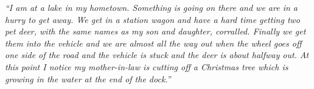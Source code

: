 \begin{minipage}[t]{0.75\textwidth}
\begin{spacing}{0.5}
    {\scriptsize \it
    ``I am at a lake in my hometown.
    Something is going on there and we are in a hurry to get away.
    We get in a station wagon and have a hard time getting two pet deer, with the same names as my son and daughter,
    corralled.
    Finally we get them into the vehicle and we are almost all the way out when the wheel goes off one side of the road
    and the vehicle is stuck and the deer is about halfway out. At this point I notice my mother-in-law is cutting off
    a Christmas tree which is growing in the water at the end of the dock.''}
\end{spacing}
\end{minipage}
